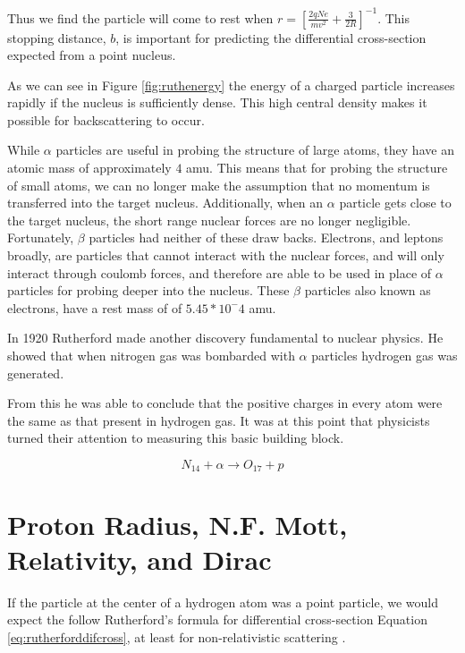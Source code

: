 \documentclass[12pt]{article}
\begin{document}
Thus we find the particle will come to rest when $r=[\frac{2qNe}{mv^2} + \frac{3}{2R}]^{-1}$.
This stopping distance, $b$, is important for predicting the differential cross-section expected from a point nucleus.


As we can see in Figure \ref{fig:ruthenergy} the energy of a charged particle increases rapidly if the nucleus is sufficiently dense. This high central density makes it possible for backscattering to occur.

While $\alpha$ particles are useful in probing the structure of large atoms, they have an atomic mass of approximately $4$ amu.
This means that for probing the structure of small atoms, we can no longer make the assumption that no momentum is transferred into the target nucleus.
Additionally, when an $\alpha$ particle gets close to the target nucleus, the short range nuclear forces are no longer negligible.
Fortunately, $\beta$ particles had neither of these draw backs.
Electrons, and leptons broadly, are particles that cannot interact with the nuclear forces, and will only interact through coulomb forces, and therefore are able to be used in place of $\alpha$ particles for probing deeper into the nucleus.
These $\beta$ particles also known as electrons, have a rest mass of of $5.45*10^-4$ amu.


In 1920 Rutherford made another discovery fundamental to nuclear physics. He showed that when nitrogen gas was bombarded with $\alpha$ particles hydrogen gas was generated.

From this he was able to conclude that the positive charges in every atom were the same as that present in hydrogen gas\cite{Rutherford1920}.
It was at this point that physicists turned their attention to measuring this basic building block.

\begin{equation}\label{eq:proton_disc}
    N_{14} + \alpha \rightarrow O_{17} + p
\end{equation}

\section{Proton Radius, N.F. Mott, Relativity, and Dirac}

If the particle at the center of a hydrogen atom was a point particle, we would expect the follow Rutherford's formula for differential cross-section Equation \ref{eq:rutherforddifcross}, at least for non-relativistic scattering \cite{Hofstadter1956}.
\end{document}
